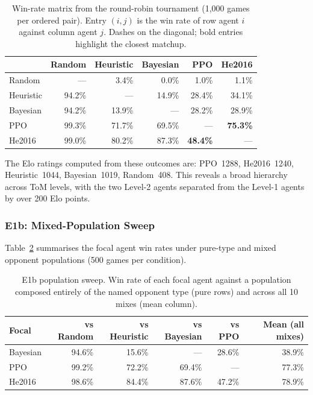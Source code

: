 \documentclass{article}
\begin{document}
  \begin{table}[h]
  \centering
  \caption{Win-rate matrix from the round-robin tournament (1{,}000 games per
  ordered pair). Entry $(i,j)$ is the win rate of row agent $i$ against column
  agent $j$. Dashes on the diagonal; bold entries highlight the closest matchup.}
  \label{tab:rq1_winrates}
  \begin{tabular}{lrrrrr}
  \toprule
   & Random & Heuristic & Bayesian & PPO & He2016 \\
  \midrule
  Random    & ---    & 3.4\%  & 0.0\%  & 1.0\%  & 1.1\%  \\
  Heuristic & 94.2\% & ---    & 14.9\% & 28.4\% & 34.1\% \\
  Bayesian  & 94.2\% & 13.9\% & ---    & 28.2\% & 28.9\% \\
  PPO       & 99.3\% & 71.7\% & 69.5\% & ---    & \textbf{75.3\%} \\
  He2016    & 99.0\% & 80.2\% & 87.3\% & \textbf{48.4\%} & --- \\
  \bottomrule
  \end{tabular}
  \end{table}

  The Elo ratings computed from these outcomes are: PPO~1288, He2016~1240,
  Heuristic~1044, Bayesian~1019, Random~408. This reveals a broad hierarchy across
  ToM levels, with the two Level-2 agents separated from the Level-1 agents by over
  200 Elo points.

  \subsubsection{E1b: Mixed-Population Sweep}

  Table~\ref{tab:rq1_sweep} summarises the focal agent win rates under pure-type
  and mixed opponent populations (500 games per condition).

  \begin{table}[h]
  \centering
  \caption{E1b population sweep. Win rate of each focal agent against a
  population composed entirely of the named opponent type (pure rows) and across
  all 10 mixes (mean column).}
  \label{tab:rq1_sweep}
  \begin{tabular}{lrrrrr}
  \toprule
  Focal & vs Random & vs Heuristic & vs Bayesian & vs PPO & Mean (all mixes) \\
  \midrule
  Bayesian & 94.6\% & 15.6\% & ---    & 28.6\% & 38.9\% \\
  PPO      & 99.2\% & 72.2\% & 69.4\% & ---    & 77.3\% \\
  He2016   & 98.6\% & 84.4\% & 87.6\% & 47.2\% & 78.9\% \\
  \bottomrule
  \end{tabular}
  \end{table}
\end{document}
